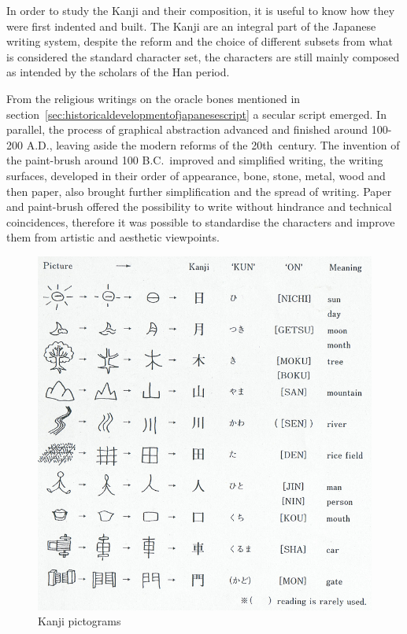 In order to study the Kanji and their composition, it is useful to know how they
were first indented and built. The Kanji are an integral part of the Japanese
writing system, despite the reform and the choice of different subsets from what 
is considered the standard character set, the characters are still mainly 
composed as intended by the scholars of the Han period.

From the religious writings on the oracle bones mentioned in 
section~\ref{sec:historicaldevelopmentofjapanesescript} a secular script 
emerged. In parallel, the process of graphical abstraction advanced and
finished around 100-200 A.D., leaving aside the modern reforms of the 
20th~century. The invention of the paint-brush around 100 B.C.\ improved and 
simplified writing, the writing surfaces, developed in their order of 
appearance, bone, stone, metal, wood and then paper, also brought further 
simplification and the spread of writing. Paper and paint-brush offered the 
possibility to write without hindrance and technical coincidences, 
therefore it was possible to standardise the characters and improve them from 
artistic and aesthetic viewpoints.

\begin{figure}[htbp]
\begin{center}
\includegraphics[scale=0.4]{images/Kanjipictograms.png}
\caption{Kanji pictograms}
\label{fig:Kanjipictograms}
\end{center}
\end{figure}


